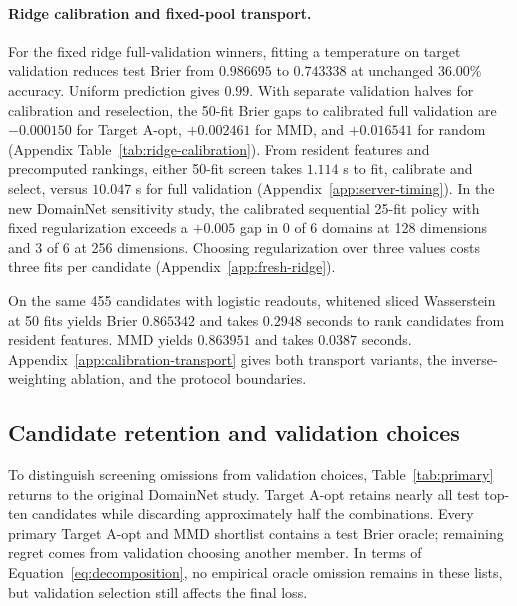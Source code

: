 \paragraph{Ridge calibration and fixed-pool transport.}
For the fixed ridge full-validation winners, fitting a temperature on target validation reduces test Brier from $0.986695$ to $0.743338$ at unchanged $36.00\%$ accuracy. Uniform prediction gives $0.99$. With separate validation halves for calibration and reselection, the 50-fit Brier gaps to calibrated full validation are $-0.000150$ for Target A-opt, $+0.002461$ for MMD, and $+0.016541$ for random (Appendix Table~\ref{tab:ridge-calibration}). From resident features and precomputed rankings, either 50-fit screen takes $1.114$ s to fit, calibrate and select, versus $10.047$ s for full validation (Appendix~\ref{app:server-timing}). In the new DomainNet sensitivity study, the calibrated sequential 25-fit policy with fixed regularization exceeds a $+0.005$ gap in 0 of 6 domains at 128 dimensions and 3 of 6 at 256 dimensions. Choosing regularization over three values costs three fits per candidate (Appendix~\ref{app:fresh-ridge}).

On the same 455 candidates with logistic readouts, whitened sliced Wasserstein at 50 fits yields Brier $0.865342$ and takes $0.2948$ seconds to rank candidates from resident features. MMD yields $0.863951$ and takes $0.0387$ seconds. Appendix~\ref{app:calibration-transport} gives both transport variants, the inverse-weighting ablation, and the protocol boundaries.

\subsection{Candidate retention and validation choices}
To distinguish screening omissions from validation choices, Table~\ref{tab:primary} returns to the original DomainNet study. Target A-opt retains nearly all test top-ten candidates while discarding approximately half the combinations. Every primary Target A-opt and MMD shortlist contains a test Brier oracle; remaining regret comes from validation choosing another member. In terms of Equation~\eqref{eq:decomposition}, no empirical oracle omission remains in these lists, but validation selection still affects the final loss.

\begin{table}[t]
\centering
\caption{The fixed-geometry comparison retains $s=227$ of 455 combinations. Means average encoders within six target domains. Recall concerns the test Brier top ten; regret is relative to oracle Brier. Spearman measures agreement between the complete screening and test-loss rankings.}
\label{tab:primary}

\end{table}

